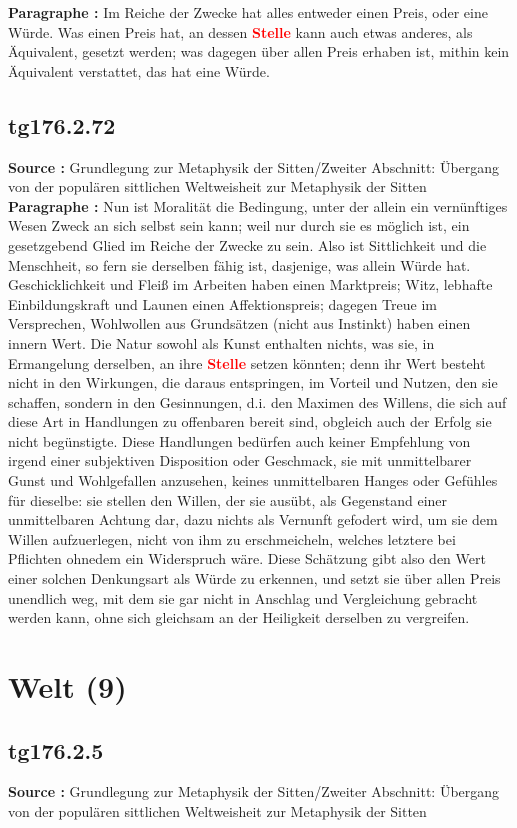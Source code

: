 \documentclass[a4paper,12pt,twoside]{book}
\newcommand{\match}[1]{\textcolor{red}{\textbf{#1}}}
\newcommand{\unnumberedsection}[1]{
	\section*{#1}
	\addcontentsline{toc}{section}{#1}
	\markright{#1}
}
\begin{document}
	\noindent\textbf{Paragraphe : }
	Im Reiche der Zwecke hat alles entweder einen Preis, oder eine Würde. Was einen Preis hat, an dessen \match{Stelle} kann auch etwas anderes, als Äquivalent, gesetzt werden; was dagegen über allen Preis erhaben ist, mithin kein Äquivalent verstattet, das hat eine Würde. 
	
	\subsection*{tg176.2.72} 
	\textbf{Source : }Grundlegung zur Metaphysik der Sitten/Zweiter Abschnitt: Übergang von der populären sittlichen Weltweisheit zur Metaphysik der Sitten\\  
	
	\noindent\textbf{Paragraphe : }Nun ist Moralität die Bedingung, unter der allein ein vernünftiges Wesen Zweck an sich selbst sein kann; weil nur durch sie es möglich ist, ein gesetzgebend Glied im Reiche der Zwecke zu sein. Also ist Sittlichkeit und die Menschheit, so fern sie derselben fähig ist, dasjenige, was allein Würde hat. Geschicklichkeit und Fleiß im Arbeiten haben einen Marktpreis; Witz, lebhafte Einbildungskraft und Launen einen Affektionspreis; dagegen Treue im Versprechen, Wohlwollen aus Grundsätzen (nicht aus Instinkt) haben einen innern Wert. Die Natur sowohl als Kunst enthalten nichts, was sie, in Ermangelung derselben, an ihre \match{Stelle} setzen könnten; denn ihr Wert besteht nicht in den Wirkungen, die daraus entspringen, im Vorteil und Nutzen, den sie schaffen, sondern in den Gesinnungen, d.i. den Maximen des Willens, die sich auf diese Art in Handlungen zu offenbaren bereit sind, obgleich auch der Erfolg sie nicht begünstigte. Diese Handlungen bedürfen auch keiner Empfehlung von irgend einer subjektiven Disposition oder Geschmack, sie mit unmittelbarer Gunst und Wohlgefallen anzusehen, keines unmittelbaren Hanges oder Gefühles für dieselbe: sie stellen den Willen, der sie ausübt, als Gegenstand einer unmittelbaren Achtung dar, dazu nichts als Vernunft gefodert wird, um sie dem Willen aufzuerlegen, nicht von  ihm zu erschmeicheln, welches letztere bei Pflichten ohnedem ein Widerspruch wäre. Diese Schätzung gibt also den Wert einer solchen Denkungsart als Würde zu erkennen, und setzt sie über allen Preis unendlich weg, mit dem sie gar nicht in Anschlag und Vergleichung gebracht werden kann, ohne sich gleichsam an der Heiligkeit derselben zu vergreifen. 
	
	\unnumberedsection{Welt (9)} 
	\subsection*{tg176.2.5} 
	\textbf{Source : }Grundlegung zur Metaphysik der Sitten/Zweiter Abschnitt: Übergang von der populären sittlichen Weltweisheit zur Metaphysik der Sitten\\  
	
\end{document}
